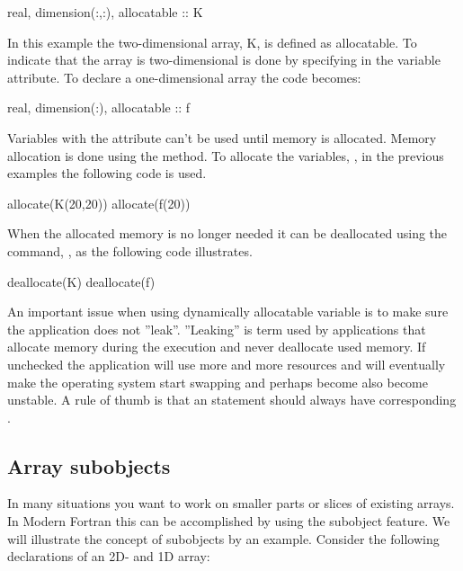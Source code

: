 \begin{fortrancodeenv}
real, dimension(:,:), allocatable :: K
\end{fortrancodeenv}

In this example the two-dimensional array, K, is defined as allocatable. To indicate that the array is two-dimensional is done by specifying  in the variable attribute. To declare a one-dimensional array the code becomes:

\begin{fortrancodeenv}
real, dimension(:), allocatable :: f
\end{fortrancodeenv}

Variables with the  attribute can't be used until memory is allocated. Memory allocation is done using the  method. To allocate the variables, , in the previous examples the following code is used.

\begin{fortrancodeenv}
allocate(K(20,20))
allocate(f(20))
\end{fortrancodeenv}

When the allocated memory is no longer needed it can be deallocated using the command, , as the following code illustrates.

\begin{fortrancodeenv}
deallocate(K)
deallocate(f)
\end{fortrancodeenv}

An important issue when using dynamically allocatable variable is to make sure the application does not ''leak''. ''Leaking'' is term used by applications that allocate memory during the execution and never deallocate used memory. If unchecked the application will use more and more resources and will eventually make the operating system start swapping and perhaps become also become unstable. A rule of thumb is that an
 statement should always have corresponding .

\subsection{Array subobjects}

In many situations you want to work on smaller parts or slices of existing arrays. In Modern Fortran this can be accomplished by using the subobject feature. We will illustrate the concept of subobjects by an example. Consider the following declarations of an 2D- and 1D array:

